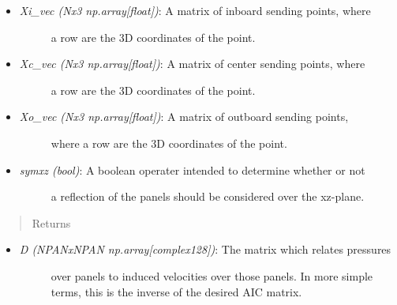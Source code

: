 \documentclass[letterpaper,10pt,english]{sphinxmanual}
\begin{document}
\begin{fulllineitems}
\begin{itemize}
\begin{description}
\end{description}

\item {} \begin{description}
\item[{\emph{Xi\_vec (Nx3 np.array{[}float{]})}: A matrix of inboard sending points, where}] \leavevmode
a row are the 3D coordinates of the point.

\end{description}

\item {} \begin{description}
\item[{\emph{Xc\_vec (Nx3 np.array{[}float{]})}: A matrix of center sending points, where}] \leavevmode
a row are the 3D coordinates of the point.

\end{description}

\item {} \begin{description}
\item[{\emph{Xo\_vec (Nx3 np.array{[}float{]})}: A matrix of outboard sending points,}] \leavevmode
where a row are the 3D coordinates of the point.

\end{description}

\item {} \begin{description}
\item[{\emph{symxz (bool)}: A boolean operater intended to determine whether or not}] \leavevmode
a reflection of the panels should be considered over the xz-plane.

\end{description}

\end{itemize}
\begin{quote}\begin{description}
\item[{Returns}] \leavevmode
\end{description}\end{quote}
\begin{itemize}
\item {} \begin{description}
\item[{\emph{D (NPANxNPAN np.array{[}complex128{]})}: The matrix which relates pressures}] \leavevmode
over panels to induced velocities over those panels. In more simple
terms, this is the inverse of the desired AIC matrix.

\end{description}

\end{itemize}

\end{fulllineitems}
\end{document}
